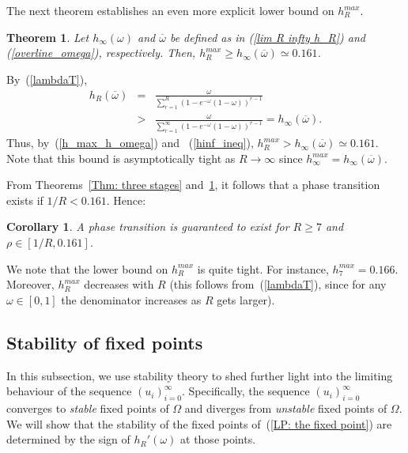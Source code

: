 \documentclass{IEEEtran}
\newtheorem{theorem}{Theorem}
\newtheorem{corollary}{Corollary}
\begin{document}
The next theorem establishes an even more explicit lower bound on $h^{max}_R$.




\begin{theorem}
\label{Thm:specific range of lambda T}
Let $h_\infty(\omega)$ and $\overline{\omega}$ be defined as in (\ref{lim R infty h_R}) and (\ref{overline_omega}), respectively. Then,
$h^{max}_R \geq h_\infty(\overline{\omega}) \simeq 0.161$.
\end{theorem}
\begin{IEEEproof}
By~(\ref{lambdaT}),
\begin{eqnarray}
h_R(\overline{\omega}) & = & \frac{\omega}{\sum_{r=1}^{R}(1-e^{-\omega}(1-\omega))^{r-1}} \nonumber\\
& > & \frac{\omega}{\sum_{r=1}^{\infty}(1-e^{-\omega}(1-\omega))^{r-1}} = h_\infty(\overline{\omega}). \label{hinf_ineq}
\end{eqnarray}
Thus, by~(\ref{h_max_h_omega}) and ~(\ref{hinf_ineq}), $h^{max}_R > h_\infty(\overline{\omega}) \simeq 0.161$. Note that this bound is
asymptotically tight as $R \to \infty$ since $h^{max}_{\infty} = h_\infty(\overline{\omega})$.
\end{IEEEproof}

From Theorems~\ref{Thm: three stages} and~\ref{Thm:specific range of lambda T}, it follows that a phase transition exists if $1/R < 0.161$. Hence:
\begin{corollary}\label{R>=7}
A phase transition is guaranteed to exist for $R\geq7$ and $\rho \in [1/R,0.161]$.
\end{corollary}
We note that the lower bound on $h^{max}_R$ is quite tight. For instance, $h^{max}_7=0.166$. Moreover, $h^{max}_R$ decreases with $R$ (this follows
from~(\ref{lambdaT}), since for any $\omega \in [0,1]$ the denominator increases as $R$ gets larger).







\subsection{Stability of fixed points}
\label{Stability of Fixed point}
In this subsection, we use stability theory to shed further light into the limiting behaviour of the sequence $(u_i)_{i=0}^{\infty}$.
Specifically, the sequence $(u_i)_{i=0}^{\infty}$ converges to \emph{stable} fixed points of $\Omega$ and diverges from \emph{unstable} fixed points
of $\Omega$. We will show that the stability of the fixed points of~(\ref{LP: the fixed point}) are determined by the sign of $h_R'(\omega)$ at
those points.
\end{document}
